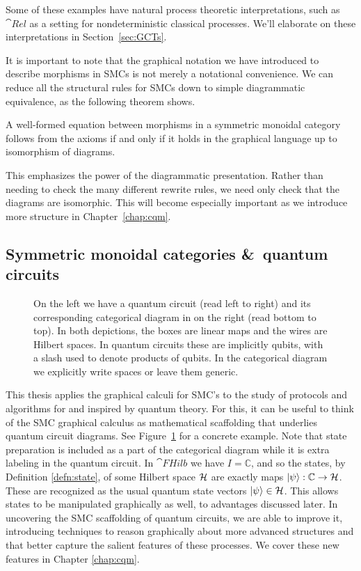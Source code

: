Some of these examples have natural process theoretic interpretations, such as $\cat{Rel}$ as a setting for nondeterministic classical processes. We'll elaborate on these interpretations in Section~\ref{sec:GCTs}.

It is important to note that the graphical notation we have introduced to describe morphisms in SMCs is not merely a notational convenience. We can reduce all the structural rules for SMCs down to simple diagrammatic equivalence, as the following theorem shows.

\begin{theorem}{\cite[Thm 2.3]{joyal1991geometry}}
A well-formed equation between morphisms in a symmetric monoidal category follows from the axioms if and only if it holds in the graphical language up to isomorphism of diagrams.
\end{theorem}

\noindent This emphasizes the power of the diagrammatic presentation.  Rather than needing to check the many different rewrite rules, we need only check that the diagrams are isomorphic.  This will become especially important as we introduce more structure in Chapter~\ref{chap:cqm}.

\subsection{Symmetric monoidal categories \&\ quantum circuits}
\begin{figure}[t]
\label{fig:QCDSMC}

\caption[Comparison of quantum circuits and symmetric monoidal diagrams]{On the left we have a quantum circuit (read left to right) and its corresponding categorical diagram in  on the right (read bottom to top). In both depictions, the boxes are linear maps and the wires are Hilbert spaces. In quantum circuits these are implicitly qubits, with a slash used to denote products of qubits. In the categorical diagram we explicitly write spaces or leave them generic.}
\end{figure}

This thesis applies the graphical calculi for SMC's to the study of protocols and algorithms for and inspired by quantum theory. For this, it can be useful to think of the SMC graphical calculus as mathematical scaffolding that underlies quantum circuit diagrams. See Figure~\ref{fig:QCDSMC} for a concrete example. Note that state preparation is included as a part of the categorical diagram while it is extra labeling in the quantum circuit. In $\cat{FHilb}$ we have $I=\mathbb{C}$, and so the states, by Definition \ref{defn:state}, of some Hilbert space $\mathcal{H}$ are exactly maps $| \psi \rangle:\mathbb{C}\to\mathcal{H}$. These are recognized as the usual quantum state vectors $| \psi \rangle\in\mathcal{H}$. This allows states to be manipulated graphically as well, to advantages discussed later. In uncovering the SMC scaffolding of quantum circuits, we are able to improve it, introducing techniques to reason graphically about more advanced structures and that better capture the salient features of these processes. We cover these new features in Chapter \ref{chap:cqm}.

